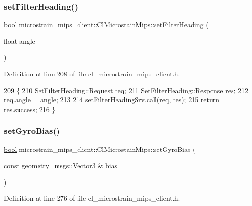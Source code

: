 \subsubsection{\texorpdfstring{set\+Filter\+Heading()}{setFilterHeading()}}
{\footnotesize\ttfamily \hyperlink{classbool}{bool} microstrain\+\_\+mips\+\_\+client\+::\+Cl\+Microstain\+Mips\+::set\+Filter\+Heading (\begin{DoxyParamCaption}\item[{float}]{angle }\end{DoxyParamCaption})\hspace{0.3cm}{\ttfamily [inline]}}



Definition at line 208 of file cl\+\_\+microstrain\+\_\+mips\+\_\+client.\+h.


\begin{DoxyCode}
209     \{
210         SetFilterHeading::Request req;
211         SetFilterHeading::Response res;
212         req.angle = angle;
213 
214         \hyperlink{classmicrostrain__mips__client_1_1ClMicrostainMips_aa83a0e93c3f31acb10044f01036bda75}{setFilterHeadingSrv}.call(req, res);
215         \textcolor{keywordflow}{return} res.success;
216     \}
\end{DoxyCode}
\mbox{\label{classmicrostrain__mips__client_1_1ClMicrostainMips_a8158790c0154c7e7412594276f448c33}} 
\subsubsection{\texorpdfstring{set\+Gyro\+Bias()}{setGyroBias()}}
{\footnotesize\ttfamily \hyperlink{classbool}{bool} microstrain\+\_\+mips\+\_\+client\+::\+Cl\+Microstain\+Mips\+::set\+Gyro\+Bias (\begin{DoxyParamCaption}\item[{const geometry\+\_\+msgs\+::\+Vector3 \&}]{bias }\end{DoxyParamCaption})\hspace{0.3cm}{\ttfamily [inline]}}



Definition at line 276 of file cl\+\_\+microstrain\+\_\+mips\+\_\+client.\+h.


